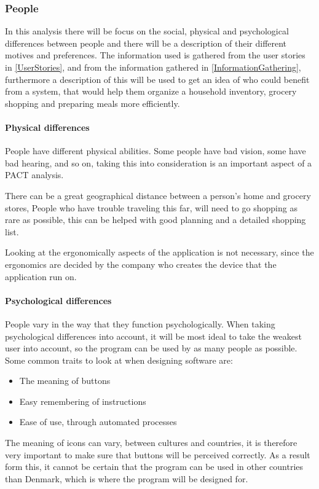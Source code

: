\subsubsection{People} \label{PeoplePACT}
In this analysis there will be focus on the social, physical and psychological differences between people and there will be a description of their different motives and preferences. The information used is gathered from the user stories in \cref{UserStories}, and from the information gathered in \cref{InformationGathering}, furthermore a description of this will be used to get an idea of who could benefit from a system, that would help them organize a household inventory, grocery shopping and preparing meals more efficiently.

\paragraph{Physical differences}
People have different physical abilities. Some people have bad vision, some have bad hearing, and so on, taking this into consideration is an important aspect of a PACT analysis.

There can be a great geographical distance between a person's home and grocery stores, People who have trouble traveling this far, will need to go shopping as rare as possible, this can be helped with good planning and a detailed shopping list.

Looking at the ergonomically aspects of the application is not necessary, since the ergonomics are decided by the company who creates the device that the application run on.

\paragraph{Psychological differences}
People vary in the way that they function psychologically. When taking psychological differences into account, it will be most ideal to take the weakest user into account, so the program can be used by as many people as possible. Some common traits to look at when designing software are:
\begin{itemize}
    \item The meaning of buttons
    \item Easy remembering of instructions
    \item Ease of use, through automated processes
\end{itemize}
The meaning of icons can vary, between cultures and countries, it is therefore very important to make sure that buttons will be perceived correctly. As a result form this, it cannot be certain that the program can be used in other countries than Denmark, which is where the program will be designed for.


